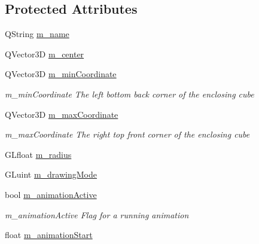 \subsection*{Protected Attributes}
\begin{DoxyCompactItemize}
\item 
Q\+String \mbox{\hyperlink{class_g_l_body_a348178ac24c376d6ebfe280ce30ff9c4}{m\+\_\+name}}
\item 
Q\+Vector3D \mbox{\hyperlink{class_g_l_body_afffadedad59d067a5fd8cd24d82ab95b}{m\+\_\+center}}
\item 
\mbox{\label{class_g_l_body_a6151001e1a78005be6ebbbdbf814ffe3}} 
Q\+Vector3D \mbox{\hyperlink{class_g_l_body_a6151001e1a78005be6ebbbdbf814ffe3}{m\+\_\+min\+Coordinate}}
\begin{DoxyCompactList}\small\item\em m\+\_\+min\+Coordinate The left bottom back corner of the enclosing cube \end{DoxyCompactList}\item 
\mbox{\label{class_g_l_body_aa92b3be1a0e0f852e7a19ce55fd8c1b1}} 
Q\+Vector3D \mbox{\hyperlink{class_g_l_body_aa92b3be1a0e0f852e7a19ce55fd8c1b1}{m\+\_\+max\+Coordinate}}
\begin{DoxyCompactList}\small\item\em m\+\_\+max\+Coordinate The right top front corner of the enclosing cube \end{DoxyCompactList}\item 
G\+Lfloat \mbox{\hyperlink{class_g_l_body_a96006c2b453ffe0490bee1961e61e3b3}{m\+\_\+radius}}
\item 
G\+Luint \mbox{\hyperlink{class_g_l_body_a3c6c3d3afde4a1990c3cc97976fd5bd8}{m\+\_\+drawing\+Mode}}
\item 
\mbox{\label{class_g_l_body_af93b66b39a57548765d0d134db1ea35a}} 
bool \mbox{\hyperlink{class_g_l_body_af93b66b39a57548765d0d134db1ea35a}{m\+\_\+animation\+Active}}
\begin{DoxyCompactList}\small\item\em m\+\_\+animation\+Active Flag for a running animation \end{DoxyCompactList}\item 
\mbox{\label{class_g_l_body_a504aa46f6ae7ee454f38bb96c466e561}} 
float \mbox{\hyperlink{class_g_l_body_a504aa46f6ae7ee454f38bb96c466e561}{m\+\_\+animation\+Start}}

\end{DoxyCompactItemize}

